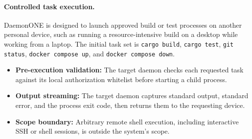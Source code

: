 \documentclass[10pt,twocolumn]{article}
\begin{document}
\paragraph{Controlled task execution.} DaemonONE is designed to launch approved build or test processes on another personal device, such as running a resource-intensive build on a desktop while working from a laptop. The initial task set is \texttt{cargo build}, \texttt{cargo test}, \texttt{git status}, \texttt{docker compose up}, and \texttt{docker compose down}.
\begin{itemize}
  \item \textbf{Pre-execution validation:} The target daemon checks each requested task against its local authorization whitelist before starting a child process.
  \item \textbf{Output streaming:} The target daemon captures standard output, standard error, and the process exit code, then returns them to the requesting device.
  \item \textbf{Scope boundary:} Arbitrary remote shell execution, including interactive SSH or shell sessions, is outside the system's scope.
\end{itemize}
\end{document}
